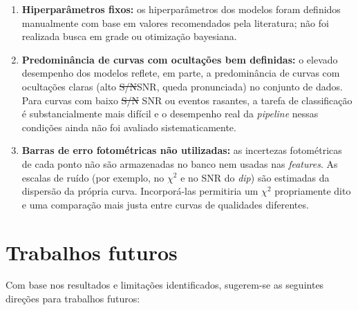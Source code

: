 \documentclass[msc]{on} %
\makeatletter
\providecommand{\DIFaddtex}[1]{{\protect\color{red}#1}} %
\providecommand{\DIFdeltex}[1]{{\protect\color{red}\sout{#1}}} %
\providecommand{\DIFaddbegin}{} %
\providecommand{\DIFaddend}{} %
\providecommand{\DIFdelbegin}{} %
\providecommand{\DIFdelend}{} %
\providecommand{\DIFadd}[1]{\texorpdfstring{\DIFaddtex{#1}}{#1}} %
\providecommand{\DIFdel}[1]{\texorpdfstring{\DIFdeltex{#1}}{}} %
\let\sout@orig\sout %
\renewcommand{\sout}[1]{\ifmmode\text{\sout@orig{\ensuremath{#1}}}\else\sout@orig{#1}\fi} %
\makeatother
\begin{document}
\begin{enumerate}
	\item \textbf{Hiperparâmetros fixos:} os hiperparâmetros dos modelos foram definidos manualmente com base em valores recomendados pela literatura; não foi realizada busca em grade ou otimização bayesiana.

	\item \textbf{Predominância de curvas com ocultações bem definidas:} o elevado desempenho dos modelos reflete, em parte, a predominância de curvas com ocultações claras (alto \DIFdelbegin \DIFdel{S/N}\DIFdelend \DIFaddbegin \DIFadd{SNR}\DIFaddend , queda pronunciada) no conjunto de dados. Para curvas com baixo \DIFdelbegin \DIFdel{S/N }\DIFdelend \DIFaddbegin \DIFadd{SNR }\DIFaddend ou eventos rasantes, a tarefa de classificação é substancialmente mais difícil e o desempenho real da \textit{pipeline} nessas condições ainda não foi avaliado sistematicamente.
\DIFaddbegin 

	\item \textbf{\DIFadd{Barras de erro fotométricas não utilizadas:}} \DIFadd{as incertezas fotométricas de cada ponto não são armazenadas no banco nem usadas nas }\textit{\DIFadd{features}}\DIFadd{. As escalas de ruído (por exemplo, no $\chi^2$ e no SNR do }\textit{\DIFadd{dip}}\DIFadd{) são estimadas da dispersão da própria curva. Incorporá-las permitiria um $\chi^2$ propriamente dito e uma comparação mais justa entre curvas de qualidades diferentes.
}\DIFaddend \end{enumerate}

\section{Trabalhos futuros}

Com base nos resultados e limitações identificados, sugerem-se as seguintes direções para trabalhos futuros:
\end{document}
